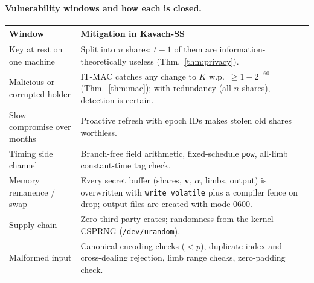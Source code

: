 \documentclass[11pt]{article}
\theoremstyle{remark}
\newcommand{\vect}[1]{\mathbf{#1}}
\begin{document}
\paragraph{Vulnerability windows and how each is closed.}
\begin{center}
\small
\begin{tabularx}{\textwidth}{>{\raggedright\arraybackslash}p{4.2cm}X}
\toprule
Window & Mitigation in Kavach-SS\\
\midrule
Key at rest on one machine & Split into $n$ shares; $t-1$ of them are information-theoretically useless (Thm.~\ref{thm:privacy}).\\
Malicious or corrupted holder & IT-MAC catches any change to $K$ w.p.\ $\ge 1-2^{-60}$ (Thm.~\ref{thm:mac}); with redundancy (all $n$ shares), detection is certain.\\
Slow compromise over months & Proactive refresh with epoch IDs makes stolen old shares worthless.\\
Timing side channel & Branch-free field arithmetic, fixed-schedule \texttt{pow}, all-limb constant-time tag check.\\
Memory remanence / swap & Every secret buffer (shares, $\vect v$, $\alpha$, limbs, output) is overwritten with \texttt{write\_volatile} plus a compiler fence on drop; output files are created with mode 0600.\\
Supply chain & Zero third-party crates; randomness from the kernel CSPRNG (\texttt{/dev/urandom}).\\
Malformed input & Canonical-encoding checks ($<p$), duplicate-index and cross-dealing rejection, limb range checks, zero-padding check.\\
\bottomrule
\end{tabularx}
\end{center}
\end{document}
